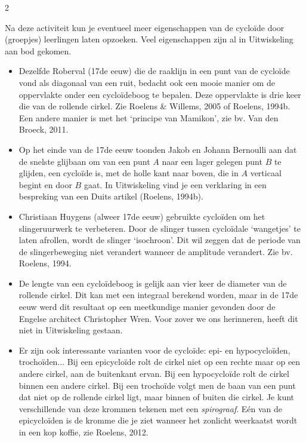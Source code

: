 \begin{multicols}{2}

Na deze activiteit kun je eventueel meer eigenschappen van de cycloïde door (groepjes) leerlingen laten opzoeken. Veel eigenschappen zijn al in Uitwiskeling aan bod gekomen.

\begin{itemize}

\item Dezelfde Roberval (17de eeuw) die de raaklijn in een punt van de cycloïde vond als diagonaal van een ruit, bedacht ook een mooie manier om de oppervlakte onder een cycloïdeboog te bepalen. Deze oppervlakte is drie keer die van de rollende cirkel. Zie Roelens \& Willems, 2005 of Roelens, 1994b. Een andere manier is met het `principe van Mamikon', zie bv. Van den Broeck, 2011.
 
\item Op het einde van de 17de eeuw toonden Jakob en Johann Bernoulli aan dat de snelste glijbaan om van een punt $A$ naar een lager gelegen punt $B$ te glijden, een cycloïde is, met de holle kant naar boven, die in $A$ verticaal begint en door $B$ gaat. In Uitwiskeling vind je een verklaring in een bespreking van een Duits artikel (Roelens, 1994b).

\item Christiaan Huygens (alweer 17de eeuw) gebruikte cycloïden om het slingeruurwerk te verbeteren. Door de slinger tussen cycloïdale `wangetjes' te laten afrollen, wordt de slinger `isochroon'. Dit wil zeggen dat de periode van de slingerbeweging niet verandert wanneer de amplitude verandert. Zie bv. Roelens, 1994.

\item De lengte van een cycloïdeboog is gelijk aan vier keer de diameter van de rollende cirkel. Dit kan met een integraal berekend worden, maar in de 17de eeuw werd dit resultaat op een meetkundige manier gevonden door de Engelse architect Christopher Wren. Voor zover we ons herinneren, heeft dit niet in Uitwiskeling gestaan.

\item Er zijn ook interessante varianten voor de cycloïde: epi- en hypocycloïden, trochoïden...  Bij een epicycloïde rolt de cirkel niet op een rechte maar op een andere cirkel, aan de buitenkant ervan. Bij een hypocycloïde rolt de cirkel binnen een andere cirkel. Bij een trochoïde volgt men de baan van een punt dat niet op de rollende cirkel ligt, maar binnen of buiten die cirkel. Je kunt verschillende van deze krommen tekenen met een \emph{spirograaf}. Eén van de epicycloïden is de kromme die je ziet wanneer het zonlicht weerkaatst wordt in een kop koffie, zie Roelens, 2012.


\end{itemize}
\end{multicols}
